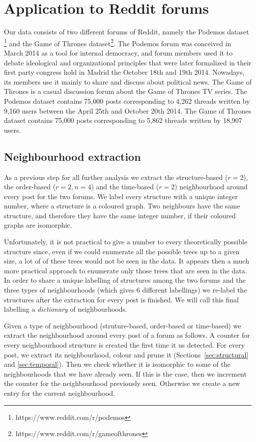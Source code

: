 \documentclass[conference]{IEEEtran}
\begin{document}
\section{Application to Reddit forums}
Our data consists of two different forums of Reddit, namely the Podemos dataset \footnote{https://www.reddit.com/r/podemos} and the Game of Thrones dataset\footnote{https://www.reddit.com/r/gameofthrones}. The Podemos forum was conceived in March 2014 as a tool for internal democracy, and forum members used it to debate ideological and organizational principles that were later formalized in their first party congress hold in Madrid the October 18th and 19th 2014. Nowadays, its members use it mainly to share and discuss about political news. The Game of Thrones is a casual discussion forum about the Game of Thrones TV series.
The Podemos dataset contains 75,000 posts corresponding to 4,262 threads written by 9,160 users between the April 25th and October 20th 2014. The Game of Thrones dataset contains 75,000 posts corresponding to 5,862 threads written by 18,907 users.

\subsection{Neighbourhood extraction}
As a previous step for all further analysis we extract the structure-based ($r=2$), the order-based ($r=2, n=4$) and the time-based ($r=2$) neighbourhood around every post for the two forums. We label every structure with a unique integer number, where a structure is a coloured graph. Two neighbours have the same structure, and therefore they have the same integer number, if their coloured graphs are isomorphic.   

Unfortunately, it is not practical to give a number to every theoretically possible structure since, even if we could enumerate all the possible trees up to a given size, a lot of of these trees would not be seen in the data. It appears then a much more practical approach to enumerate only those trees that are seen in the data. In order to share a unique labelling of structures among the two forums and the three types of neighbourhoods (which gives 6 different labellings) we re-label the structures after the extraction for every post is finished. We will call this final labelling a \textit{dictionary} of neighbourhoods.

Given a type of neighbourhood (struture-based, order-based or time-based) we extract the neighbourhood around every post of a forum as follows. A counter for every neighbourhood structure is created the first time it us detected. For every post, we extract its neighbourhood, colour and prune it (Sections~\ref{sec:structural} and \ref{sec:temporal}). Then we check whether it is isomorphic to some of the neighbourhoods that we have already seen. If this is the case, then we increment the counter for the neighbourhood previously seen. Otherwise we create a new entry for the current neighbourhood. 
\end{document}
